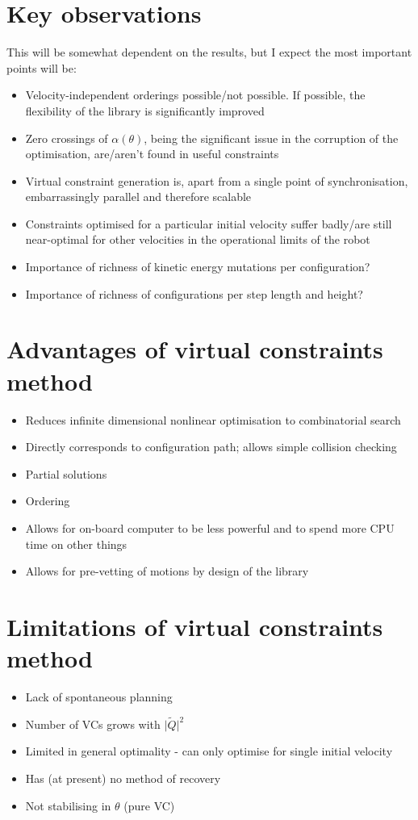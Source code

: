 \section{Key observations}
This will be somewhat dependent on the results, but I expect the most important points will be:
\begin{itemize}
	\item Velocity-independent orderings possible/not possible. If possible, the flexibility of the library is significantly improved
	\item Zero crossings of $\alpha(\theta)$, being the significant issue in the corruption of the optimisation, are/aren't found in useful constraints
	\item Virtual constraint generation is, apart from a single point of synchronisation, embarrassingly parallel and therefore scalable
	\item Constraints optimised for a particular initial velocity suffer badly/are still near-optimal for other velocities in the operational limits of the robot
	\item Importance of richness of kinetic energy mutations per configuration?
	\item Importance of richness of configurations per step length and height?
\end{itemize}

\section{Advantages of virtual constraints method}
\begin{itemize}
	\item Reduces infinite dimensional nonlinear optimisation to combinatorial search
	\item Directly corresponds to configuration path; allows simple collision checking
	\item Partial solutions
	\item Ordering
	\item Allows for on-board computer to be less powerful and to spend more CPU time on other things
	\item Allows for pre-vetting of motions by design of the library
\end{itemize}

\section{Limitations of virtual constraints method}
\begin{itemize}
	\item Lack of spontaneous planning
	\item Number of VCs grows with $\lvert\tilde{Q}\rvert^2$
	\item Limited in general optimality - can only optimise for single initial velocity
	\item Has (at present) no method of recovery
	\item Not stabilising in $\theta$ (pure VC)
\end{itemize}